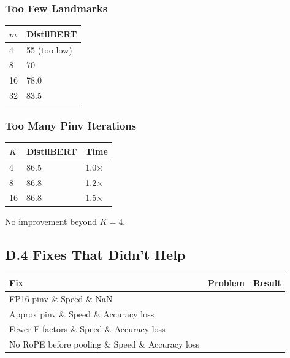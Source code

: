 \subsubsection{Too Few Landmarks}
\begin{table}[H]
\centering
\small
\begin{tabular}{ll}
\toprule
\textbf{$m$} & \textbf{DistilBERT} \\
\midrule
4 & 55 (too low) \\
8 & 70 \\
16 & 78.0 \\
32 & 83.5 \\
\bottomrule
\end{tabular}
\end{table}

\subsubsection{Too Many Pinv Iterations}
\begin{table}[H]
\centering
\small
\begin{tabular}{lll}
\toprule
\textbf{$K$} & \textbf{DistilBERT} & \textbf{Time} \\
\midrule
4 & 86.5 & 1.0$\times$ \\
8 & 86.8 & 1.2$\times$ \\
16 & 86.8 & 1.5$\times$ \\
\bottomrule
\end{tabular}
\end{table}

No improvement beyond $K = 4$.

\subsection{D.4 Fixes That Didn't Help}

\begin{table}[H]
\centering
\small
\begin{tabular}{lll}
\toprule
\textbf{Fix} & \textbf{Problem} & \textbf{Result} \\
\midrule
FP16 pinv \& Speed \& NaN \\
Approx pinv \& Speed \& Accuracy loss \\
Fewer F factors \& Speed \& Accuracy loss \\
No RoPE before pooling \& Speed \& Accuracy loss \\
\bottomrule
\end{tabular}
\end{table}

